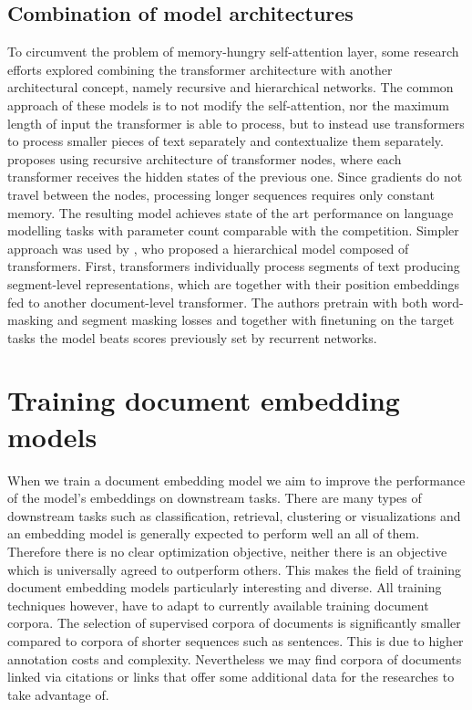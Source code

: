 \subsection{Combination of model architectures}

To circumvent the problem of memory-hungry self-attention layer, some research
efforts explored combining the transformer architecture with another
architectural concept, namely recursive and hierarchical networks. The common
approach of these models is to not modify the self-attention, nor the maximum
length of input the transformer is able to process, but to instead use
transformers to process smaller pieces of text separately and contextualize
them separately. \cite{dai2019transformer} proposes using recursive
architecture of transformer nodes, where each transformer receives the hidden
states of the previous one. Since gradients do not travel between the nodes,
processing longer sequences requires only constant memory. The resulting model
achieves state of the art performance on language modelling tasks with parameter count
comparable with the competition. Simpler approach was used by
\cite{yang2020beyond}, who proposed a hierarchical model composed of
transformers. First, transformers individually process segments of text
producing segment-level representations, which are together with their position
embeddings fed to another document-level transformer. The authors pretrain with
both word-masking and segment masking losses and together with finetuning on
the target tasks the model beats scores previously set by recurrent networks.


\section{Training document embedding models}





When we train a document embedding model we aim to improve the performance of
the model's embeddings on downstream tasks. There are many types of downstream
tasks such as classification, retrieval, clustering or visualizations and an
embedding model is generally expected to perform well an all of them. Therefore
there is no clear optimization objective, neither there is an objective which
is universally agreed to outperform others. This makes the field of training
document embedding models particularly interesting and diverse. All training
techniques however, have to adapt to currently available training document
corpora. The selection of supervised corpora of documents is significantly
smaller compared to corpora of shorter sequences such as sentences. This is due
to higher annotation costs and complexity. Nevertheless we may find corpora
of documents linked via citations or links that offer some additional data for
the researches to take advantage of.

